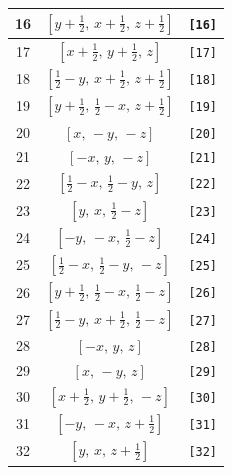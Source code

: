 \documentclass[fleqn,8pt]{jsarticle}
\begin{document}
\begin{longtable}{ccc}
16 & $\left[ y + \frac{1}{2},\, x + \frac{1}{2},\, z + \frac{1}{2} \right]$ & {\tt [16]} \\ \hline
17 & $\left[ x + \frac{1}{2},\, y + \frac{1}{2},\, z \right]$ & {\tt [17]} \\ \hline
18 & $\left[ \frac{1}{2} - y,\, x + \frac{1}{2},\, z + \frac{1}{2} \right]$ & {\tt [18]} \\ \hline
19 & $\left[ y + \frac{1}{2},\, \frac{1}{2} - x,\, z + \frac{1}{2} \right]$ & {\tt [19]} \\ \hline
20 & $\left[ x,\, - y,\, - z \right]$ & {\tt [20]} \\ \hline
21 & $\left[ - x,\, y,\, - z \right]$ & {\tt [21]} \\ \hline
22 & $\left[ \frac{1}{2} - x,\, \frac{1}{2} - y,\, z \right]$ & {\tt [22]} \\ \hline
23 & $\left[ y,\, x,\, \frac{1}{2} - z \right]$ & {\tt [23]} \\ \hline
24 & $\left[ - y,\, - x,\, \frac{1}{2} - z \right]$ & {\tt [24]} \\ \hline
25 & $\left[ \frac{1}{2} - x,\, \frac{1}{2} - y,\, - z \right]$ & {\tt [25]} \\ \hline
26 & $\left[ y + \frac{1}{2},\, \frac{1}{2} - x,\, \frac{1}{2} - z \right]$ & {\tt [26]} \\ \hline
27 & $\left[ \frac{1}{2} - y,\, x + \frac{1}{2},\, \frac{1}{2} - z \right]$ & {\tt [27]} \\ \hline
28 & $\left[ - x,\, y,\, z \right]$ & {\tt [28]} \\ \hline
29 & $\left[ x,\, - y,\, z \right]$ & {\tt [29]} \\ \hline
30 & $\left[ x + \frac{1}{2},\, y + \frac{1}{2},\, - z \right]$ & {\tt [30]} \\ \hline
31 & $\left[ - y,\, - x,\, z + \frac{1}{2} \right]$ & {\tt [31]} \\ \hline
32 & $\left[ y,\, x,\, z + \frac{1}{2} \right]$ & {\tt [32]} \\
\end{longtable}
\end{document}
